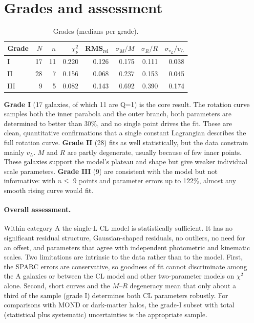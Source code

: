 \documentclass[10pt]{article}
\begin{document}
\section{Grades and assessment}
\begin{table}[h]\centering\small\caption{Grades (medians per grade).}\begin{tabular}{lrrrrrrr}\toprule Grade & $N$ & $n$ & $\chi^2_\nu$ & RMS$_\mathrm{rel}$ & $\sigma_M/M$ & $\sigma_R/R$ & $\sigma_{v_L}/v_L$\\\midrule
I & 17 & 11 & 0.220 & 0.126 & 0.175 & 0.111 & 0.038\\
II & 28 & 7 & 0.156 & 0.068 & 0.237 & 0.153 & 0.045\\
III & 9 & 5 & 0.082 & 0.143 & 0.692 & 0.390 & 0.174\\
\bottomrule\end{tabular}\end{table}
\textbf{Grade I} (17 galaxies, of which 11 are Q=1) is the core result. The rotation curve samples both the inner parabola and the outer branch, both parameters are determined to better than 30\%, and no single point drives the fit. These are clean, quantitative confirmations that a single constant Lagrangian describes the full rotation curve.
\textbf{Grade II} (28) fits as well statistically, but the data constrain mainly $v_L$. $M$ and $R$ are partly degenerate, usually because of few inner points. These galaxies support the model's plateau and shape but give weaker individual scale parameters.
\textbf{Grade III} (9) are consistent with the model but not informative: with $n\le$ 9 points and parameter errors up to 122\%, almost any smooth rising curve would fit.

\paragraph{Overall assessment.} Within category A the single-L CL model is statistically sufficient. It has no significant residual structure, Gaussian-shaped residuals, no outliers, no need for an offset, and parameters that agree with independent photometric and kinematic scales. Two limitations are intrinsic to the data rather than to the model. First, the SPARC errors are conservative, so goodness of fit cannot discriminate among the A galaxies or between the CL model and other two-parameter models on $\chi^2$ alone. Second, short curves and the $M$--$R$ degeneracy mean that only about a third of the sample (grade I) determines both CL parameters robustly. For comparisons with MOND or dark-matter halos, the grade-I subset with total (statistical plus systematic) uncertainties is the appropriate sample.
\end{document}
